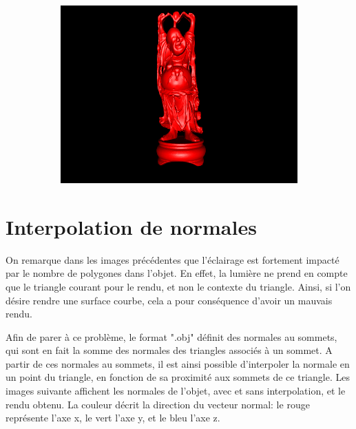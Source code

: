 \documentclass{article}
\begin{document}
\begin{figure}[hb]
  \begin{subfigure}{0.45\textwidth}
    \includegraphics[width=1\textwidth]{images/obj3.png}
  \end{subfigure}
\end{figure}

\section{Interpolation de normales}

On remarque dans les images précédentes que l'éclairage est fortement impacté
par le nombre de polygones dans l'objet. En effet, la lumière ne prend en
compte que le triangle courant pour le rendu, et non le contexte du triangle.
Ainsi, si l'on désire rendre une surface courbe, cela a pour conséquence
d'avoir un mauvais rendu.

Afin de parer à ce problème, le format ".obj" définit des normales au sommets,
qui sont en fait la somme des normales des triangles associés à un sommet. A
partir de ces normales au sommets, il est ainsi possible d'interpoler la
normale en un point du triangle, en fonction de sa proximité aux sommets de ce
triangle. Les images suivante affichent les normales de l'objet, avec et sans
interpolation, et le rendu obtenu. La couleur décrit la direction du vecteur
normal: le rouge représente l'axe x, le vert l'axe y, et le bleu l'axe z.
\end{document}
